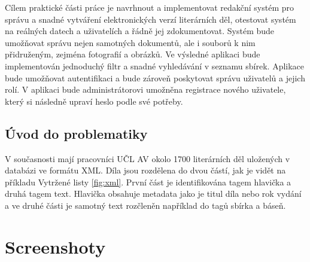 \documentclass[thesis=B,czech]{FITthesis}[2012/06/26]
\begin{document}
\begin{introduction}
        Cílem praktické části práce je navrhnout a implementovat redakční systém pro správu a snadné vytváření elektronických verzí literárních děl, otestovat systém na reálných datech a uživatelích a řádně jej zdokumentovat. Systém bude umožňovat správu nejen samotných dokumentů, ale i souborů k nim přidruženým, zejména fotografií a obrázků. Ve výsledné aplikaci bude implementován jednoduchý filtr a snadné vyhledávání v seznamu sbírek. Aplikace bude umožňovat autentifikaci a bude zároveň poskytovat správu uživatelů a jejich rolí. V aplikaci bude administrátorovi umožněna registrace nového uživatele, který si následně upraví heslo podle své potřeby.
        
    \section{Úvod do problematiky}

        V současnosti mají pracovníci UČL AV okolo 1700 literárních děl uložených v databázi ve formátu XML. Díla jsou rozdělena do dvou částí, jak je vidět na příkladu Vytržené listy \ref{fig:xml}. První část je identifikována tagem hlavička a druhá tagem text. Hlavička obsahuje metadata jako je titul díla nebo rok vydání a ve druhé části je samotný text rozčleněn například do tagů sbírka a báseň.
        
\end{introduction}

    


    







\begin{conclusion}

\end{conclusion}




\appendix

\chapter{Screenshoty}
\end{document}
